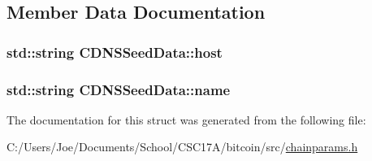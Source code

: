 \subsection{Member Data Documentation}
\hypertarget{struct_c_d_n_s_seed_data_a70f5da8568016651cfb7ec7dbf01b3f0}{}
\subsubsection[{host}]{\setlength{\rightskip}{0pt plus 5cm}std\+::string C\+D\+N\+S\+Seed\+Data\+::host}\label{struct_c_d_n_s_seed_data_a70f5da8568016651cfb7ec7dbf01b3f0}
\hypertarget{struct_c_d_n_s_seed_data_a2cf084b163340bd62b67e765799f1fdd}{}
\subsubsection[{name}]{\setlength{\rightskip}{0pt plus 5cm}std\+::string C\+D\+N\+S\+Seed\+Data\+::name}\label{struct_c_d_n_s_seed_data_a2cf084b163340bd62b67e765799f1fdd}


The documentation for this struct was generated from the following file\+:\begin{DoxyCompactItemize}
\item 
C\+:/\+Users/\+Joe/\+Documents/\+School/\+C\+S\+C17\+A/bitcoin/src/\hyperlink{chainparams_8h}{chainparams.\+h}\end{DoxyCompactItemize}
